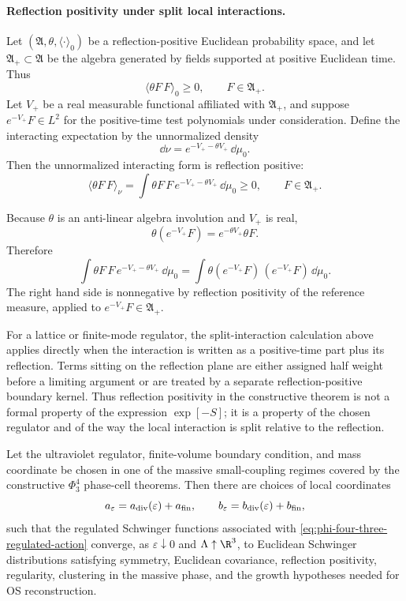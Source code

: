 \paragraph{Reflection positivity under split local interactions.}
Let \((\mathfrak A,\theta,\langle\cdot\rangle_0)\) be a reflection-positive
Euclidean probability space, and let \(\mathfrak A_+\subset\mathfrak A\) be
the algebra generated by fields supported at positive Euclidean time.  Thus
\[
  \langle \theta F\,F\rangle_0\geq0,
  \qquad F\in\mathfrak A_+ .
\]
Let \(V_+\) be a real measurable functional affiliated with
\(\mathfrak A_+\), and suppose \(e^{-V_+}F\in L^2\) for the positive-time
test polynomials under consideration.  Define the interacting expectation
by the unnormalized density
\[
  \dd\nu=e^{-V_+-\theta V_+}\,\dd\mu_0 .
\]
Then the unnormalized interacting form is reflection positive:
\begin{equation}
  \langle \theta F\,F\rangle_\nu
  =
  \int \theta F\,F\,e^{-V_+-\theta V_+}\,\dd\mu_0
  \geq0,
  \qquad F\in\mathfrak A_+ .
  \label{eq:constructive-reflection-positivity-split}
\end{equation}

Because \(\theta\) is an anti-linear algebra involution and \(V_+\) is real,
\[
  \theta(e^{-V_+}F)=e^{-\theta V_+}\theta F .
\]
Therefore
\[
  \int \theta F\,F\,e^{-V_+-\theta V_+}\,\dd\mu_0
  =
  \int
  \theta(e^{-V_+}F)\,(e^{-V_+}F)\,\dd\mu_0 .
\]
The right hand side is nonnegative by reflection positivity of the reference
measure, applied to \(e^{-V_+}F\in\mathfrak A_+\).

For a lattice or finite-mode regulator, the split-interaction calculation
above applies directly when the interaction is written as a positive-time
part plus its
reflection.  Terms sitting on the reflection plane are either assigned half
weight before a limiting argument or are treated by a separate
reflection-positive boundary kernel.  Thus reflection positivity in the
constructive theorem is not a formal property of the expression
\(\exp[-S]\); it is a property of the chosen regulator and of the way the
local interaction is split relative to the reflection.

\begin{quotedtheorem}
\label{thm:phi-four-three-constructive-output}
Let the ultraviolet regulator, finite-volume boundary condition, and mass
coordinate be chosen in one of the massive small-coupling regimes covered by
the constructive \(\Phi^4_3\) phase-cell theorems.  Then there are choices
of local coordinates
\[
  a_\varepsilon=a_{\rm div}(\varepsilon)+a_{\rm fin},\qquad
  b_\varepsilon=b_{\rm div}(\varepsilon)+b_{\rm fin},
\]
such that the regulated Schwinger functions associated with
\eqref{eq:phi-four-three-regulated-action} converge, as
\(\varepsilon\downarrow0\) and \(\Lambda\uparrow\R^3\), to Euclidean
Schwinger distributions satisfying symmetry, Euclidean covariance,
reflection positivity, regularity, clustering in the massive phase, and the
growth hypotheses needed for OS reconstruction.
\end{quotedtheorem}

